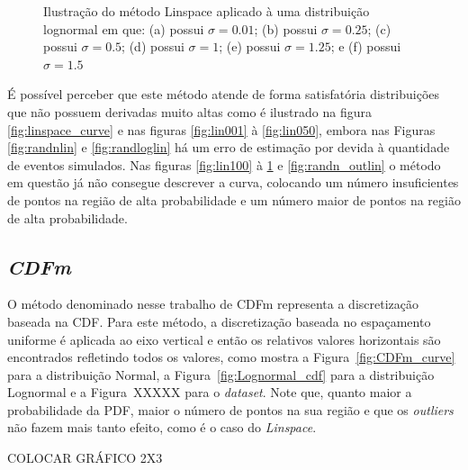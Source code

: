 \begin{figure}[H]
\begin{subfigure}[b]{0.3\textwidth}
		\caption{}
		\label{fig:lin150}
	\end{subfigure}
	\caption{Ilustração do método Linspace aplicado à uma distribuição lognormal em que: (a) possui $\sigma = 0.01$; (b) possui $\sigma = 0.25$; (c) possui $\sigma = 0.5$; (d) possui $\sigma = 1$; (e) possui $\sigma = 1.25$; e (f) possui $\sigma = 1.5$}
	\label{fig:Lognormal_lin}
\end{figure}


É possível perceber que este método atende de forma satisfatória distribuições que não possuem derivadas muito altas como é ilustrado na figura \ref{fig:linspace_curve} e nas figuras \ref{fig:lin001} à \ref{fig:lin050}, embora nas Figuras \ref{fig:randnlin} e \ref{fig:randloglin} há um erro de estimação por devida à quantidade de eventos simulados. Nas figuras \ref{fig:lin100} à \ref{fig:lin150} e \ref{fig:randn_outlin} o método em questão já não consegue descrever a curva, colocando um número insuficientes de pontos na região de alta probabilidade e um número maior de pontos na região de alta probabilidade.

\subsection{\textit{CDFm}}
O método denominado nesse trabalho de \ac{CDFm} representa a discretização baseada na \ac{CDF}. Para este método, a discretização baseada no espaçamento uniforme é aplicada ao eixo vertical e então os relativos valores horizontais são encontrados refletindo todos os valores, como mostra a Figura~\ref{fig:CDFm_curve} para a distribuição Normal, a Figura~\ref{fig:Lognormal_cdf} para a distribuição Lognormal e a Figura~XXXXX para o \textit{dataset}. Note que, quanto maior a probabilidade da \ac{PDF}, maior o número de pontos na sua região e que os \textit{outliers} não fazem mais tanto efeito, como é o caso do \textit{Linspace}.

\color{red} COLOCAR GRÁFICO 2X3 \color{black}

